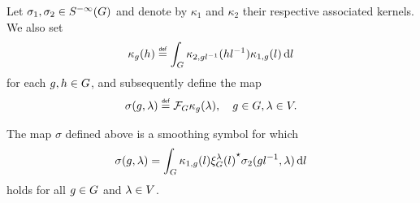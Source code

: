 \begin{lemma}
    Let $\sigma_1, \sigma_2 \in {S^{-\infty} (G)}$
    and denote by $\kappa_1$ and $\kappa_2$ their respective associated kernels.
    We also set
    \begin{align*}
        \kappa_g(h) \defeq \int_\Group \kappa_{2, g l^{-1}}(h l^{-1}) \kappa_{1, g}(l) \dd l
    \end{align*}
    for each $g, h \in G$,
    and subsequently define the map
    \begin{align*}
        \sigma(g, \lambda) \defeq \Fourier \kappa_g(\lambda),
        \quad g \in \Group, \lambda \in \VectorSpace.
    \end{align*}

    The map $\sigma$ defined above is a smoothing symbol for which
    \begin{align}
        \sigma(g, \lambda) = \int_G \kappa_{1, g}(l) {\xi^{\lambda}_{G}(l)}^\star \sigma_2(g l^{-1}, \lambda) \,\mathrm{d} l
        \label{eq:formal_expression_for_the_symbol_obtained_by_composition}
    \end{align}
    holds for all $g \in G$ and $\lambda \in V$.
\end{lemma}
